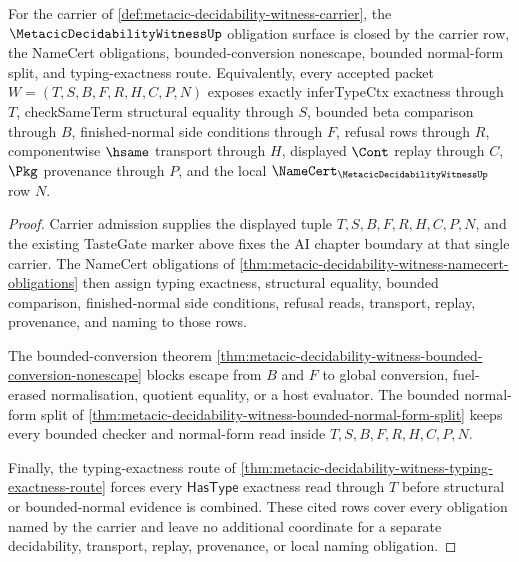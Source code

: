 \begin{theorem}
\label{thm:metacic-decidability-witness-obligation-closure-package}
For the carrier of \autoref{def:metacic-decidability-witness-carrier}, the $\MetacicDecidabilityWitnessUp$ obligation surface is closed by the carrier row, the NameCert obligations, bounded-conversion nonescape, bounded normal-form split, and typing-exactness route. Equivalently, every accepted packet $W=(T,S,B,F,R,H,C,P,N)$ exposes exactly inferTypeCtx exactness through $T$, checkSameTerm structural equality through $S$, bounded beta comparison through $B$, finished-normal side conditions through $F$, refusal rows through $R$, componentwise $\hsame$ transport through $H$, displayed $\Cont$ replay through $C$, $\Pkg$ provenance through $P$, and the local $\NameCert_{\MetacicDecidabilityWitnessUp}$ row $N$.
\end{theorem}
\begin{proof}
Carrier admission supplies the displayed tuple $T,S,B,F,R,H,C,P,N$, and the existing TasteGate marker above fixes the AI chapter boundary at that single carrier. The NameCert obligations of \autoref{thm:metacic-decidability-witness-namecert-obligations} then assign typing exactness, structural equality, bounded comparison, finished-normal side conditions, refusal reads, transport, replay, provenance, and naming to those rows.

The bounded-conversion theorem \autoref{thm:metacic-decidability-witness-bounded-conversion-nonescape} blocks escape from $B$ and $F$ to global conversion, fuel-erased normalisation, quotient equality, or a host evaluator. The bounded normal-form split of \autoref{thm:metacic-decidability-witness-bounded-normal-form-split} keeps every bounded checker and normal-form read inside $T,S,B,F,R,H,C,P,N$.

Finally, the typing-exactness route of \autoref{thm:metacic-decidability-witness-typing-exactness-route} forces every $\mathsf{HasType}$ exactness read through $T$ before structural or bounded-normal evidence is combined. These cited rows cover every obligation named by the carrier and leave no additional coordinate for a separate decidability, transport, replay, provenance, or local naming obligation.
\end{proof}

